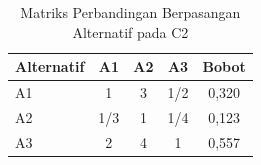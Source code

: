 \begin{table}[h]
\centering
\caption{Matriks Perbandingan Berpasangan Alternatif pada C2}
\label{tab:ahp-alt-c2}
\begin{tabular}{|l|c|c|c|c|}
\hline
\textbf{Alternatif} & \textbf{A1} & \textbf{A2} & \textbf{A3} & \textbf{Bobot} \\
\hline
A1             & 1     & 3     & 1/2   & 0,320 \\
A2             & 1/3   & 1     & 1/4   & 0,123 \\
A3             & 2     & 4     & 1     & 0,557 \\
\hline
\end{tabular}
\end{table}